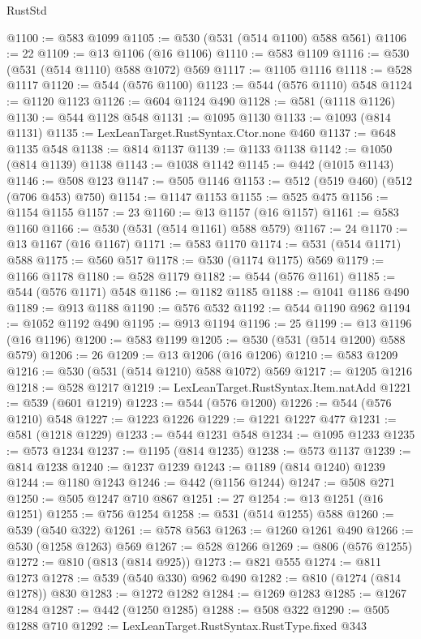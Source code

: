 \begin{lexlean}{RustStd}
\begin{coremodule}
@1100 := @583 @1099
@1105 := @530 (@531 (@514 @1100) @588 @561)
@1106 := 22
@1109 := @13 @1106 (@16 @1106)
@1110 := @583 @1109
@1116 := @530 (@531 (@514 @1110) @588 @1072) @569
@1117 := @1105 @1116
@1118 := @528 @1117
@1120 := @544 (@576 @1100)
@1123 := @544 (@576 @1110) @548
@1124 := @1120 @1123
@1126 := @604 @1124 @490
@1128 := @581 (@1118 @1126)
@1130 := @544 @1128 @548
@1131 := @1095 @1130
@1133 := @1093 (@814 @1131)
@1135 := LexLeanTarget.RustSyntax.Ctor.none @460
@1137 := @648 @1135 @548
@1138 := @814 @1137
@1139 := @1133 @1138
@1142 := @1050 (@814 @1139) @1138
@1143 := @1038 @1142
@1145 := @442 (@1015 @1143)
@1146 := @508 @123
@1147 := @505 @1146
@1153 := @512 (@519 @460) (@512 (@706 @453) @750)
@1154 := @1147 @1153
@1155 := @525 @475
@1156 := @1154 @1155
@1157 := 23
@1160 := @13 @1157 (@16 @1157)
@1161 := @583 @1160
@1166 := @530 (@531 (@514 @1161) @588 @579)
@1167 := 24
@1170 := @13 @1167 (@16 @1167)
@1171 := @583 @1170
@1174 := @531 (@514 @1171) @588
@1175 := @560 @517
@1178 := @530 (@1174 @1175) @569
@1179 := @1166 @1178
@1180 := @528 @1179
@1182 := @544 (@576 @1161)
@1185 := @544 (@576 @1171) @548
@1186 := @1182 @1185
@1188 := @1041 @1186 @490
@1189 := @913 @1188
@1190 := @576 @532
@1192 := @544 @1190 @962
@1194 := @1052 @1192 @490
@1195 := @913 @1194
@1196 := 25
@1199 := @13 @1196 (@16 @1196)
@1200 := @583 @1199
@1205 := @530 (@531 (@514 @1200) @588 @579)
@1206 := 26
@1209 := @13 @1206 (@16 @1206)
@1210 := @583 @1209
@1216 := @530 (@531 (@514 @1210) @588 @1072) @569
@1217 := @1205 @1216
@1218 := @528 @1217
@1219 := LexLeanTarget.RustSyntax.Item.natAdd
@1221 := @539 (@601 @1219)
@1223 := @544 (@576 @1200)
@1226 := @544 (@576 @1210) @548
@1227 := @1223 @1226
@1229 := @1221 @1227 @477
@1231 := @581 (@1218 @1229)
@1233 := @544 @1231 @548
@1234 := @1095 @1233
@1235 := @573 @1234
@1237 := @1195 (@814 @1235)
@1238 := @573 @1137
@1239 := @814 @1238
@1240 := @1237 @1239
@1243 := @1189 (@814 @1240) @1239
@1244 := @1180 @1243
@1246 := @442 (@1156 @1244)
@1247 := @508 @271
@1250 := @505 @1247 @710 @867
@1251 := 27
@1254 := @13 @1251 (@16 @1251)
@1255 := @756 @1254
@1258 := @531 (@514 @1255) @588
@1260 := @539 (@540 @322)
@1261 := @578 @563
@1263 := @1260 @1261 @490
@1266 := @530 (@1258 @1263) @569
@1267 := @528 @1266
@1269 := @806 (@576 @1255)
@1272 := @810 (@813 (@814 @925))
@1273 := @821 @555
@1274 := @811 @1273
@1278 := @539 (@540 @330) @962 @490
@1282 := @810 (@1274 (@814 @1278)) @830
@1283 := @1272 @1282
@1284 := @1269 @1283
@1285 := @1267 @1284
@1287 := @442 (@1250 @1285)
@1288 := @508 @322
@1290 := @505 @1288 @710
@1292 := LexLeanTarget.RustSyntax.RustType.fixed @343

\end{coremodule}
\end{lexlean}
